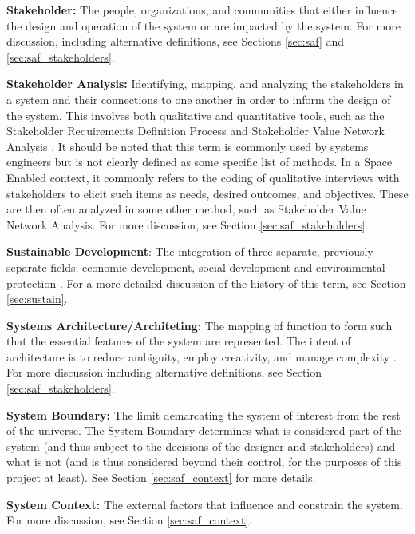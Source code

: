 \textbf{Stakeholder:} The people, organizations, and communities that either influence the design and operation of the system or are impacted by the system. For more discussion, including alternative definitions, see Sections \ref{sec:saf} and \ref{sec:saf_stakeholders}.

\textbf{Stakeholder Analysis:} Identifying, mapping, and analyzing the stakeholders in a system and their connections to one another in order to inform the design of the system. This involves both qualitative and quantitative tools, such as the Stakeholder Requirements Definition Process \cite{incoseINCOSESystemsEngineering2015} and Stakeholder Value Network Analysis \cite{fengDependencyStructureMatrix2010a}. It should be noted that this term is commonly used by systems engineers but is not clearly defined as some specific list of methods. In a Space Enabled context, it commonly refers to the coding of qualitative interviews with stakeholders to elicit such items as needs, desired outcomes, and objectives. These are then often analyzed in some other method, such as Stakeholder Value Network Analysis. For more discussion, see Section \ref{sec:saf_stakeholders}.

\textbf{Sustainable Development}: The integration of three separate, previously separate fields: economic development, social development and environmental protection \cite{worldsummitonsustainabledevelopmentPlanImplementationWorld2002}.  For a more detailed discussion of the history of this term, see Section \ref{sec:sustain}.


\textbf{Systems Architecture/Architeting:} The mapping of function to form such that the essential features of the system are represented. The intent of architecture is to reduce ambiguity, employ creativity, and manage complexity \cite{crawleySystemArchitectureStrategy2015}. For more discussion including alternative definitions, see Section \ref{sec:saf_stakeholders}.

\textbf{System Boundary:} The limit demarcating the system of interest from the rest of the universe. The System Boundary determines what is considered part of the system (and thus subject to the decisions of the designer and stakeholders) and what is not (and is thus considered beyond their control, for the purposes of this project at least). See Section \ref{sec:saf_context} for more details.

\textbf{System Context:} The external factors that influence and constrain the system. For more discussion, see Section \ref{sec:saf_context}.

